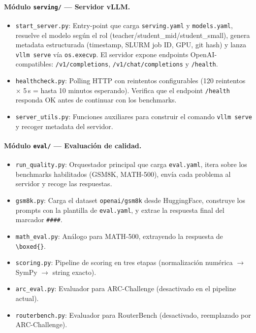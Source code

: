\documentclass[11pt,a4paper]{article}
\begin{document}
\paragraph{M\'odulo \texttt{serving/} --- Servidor vLLM.}
\begin{itemize}[leftmargin=2em]
  \item \texttt{start\_server.py}: Entry-point que carga
    \texttt{serving.yaml} y \texttt{models.yaml}, resuelve el modelo
    seg\'un el rol (teacher/student\_mid/student\_small), genera metadata
    estructurada (timestamp, SLURM job ID, GPU, git hash) y lanza
    \texttt{vllm serve} v\'ia \texttt{os.execvp}. El servidor expone
    endpoints OpenAI-compatibles: \texttt{/v1/completions},
    \texttt{/v1/chat/completions} y \texttt{/health}.
  \item \texttt{healthcheck.py}: Polling HTTP con reintentos
    configurables (120 reintentos $\times$ 5\,s = hasta 10 minutos
    esperando). Verifica que el endpoint \texttt{/health} responda OK
    antes de continuar con los benchmarks.
  \item \texttt{server\_utils.py}: Funciones auxiliares para construir
    el comando \texttt{vllm serve} y recoger metadata del servidor.
\end{itemize}

\paragraph{M\'odulo \texttt{eval/} --- Evaluaci\'on de calidad.}
\begin{itemize}[leftmargin=2em]
  \item \texttt{run\_quality.py}: Orquestador principal que carga
    \texttt{eval.yaml}, itera sobre los benchmarks habilitados (GSM8K,
    MATH-500), env\'ia cada problema al servidor y recoge las respuestas.
  \item \texttt{gsm8k.py}: Carga el dataset \texttt{openai/gsm8k} desde
    HuggingFace, construye los prompts con la plantilla de
    \texttt{eval.yaml}, y extrae la respuesta final del marcador
    \texttt{\#\#\#\#}.
  \item \texttt{math\_eval.py}: An\'alogo para MATH-500, extrayendo
    la respuesta de \texttt{\textbackslash boxed\{\}}.
  \item \texttt{scoring.py}: Pipeline de scoring en tres etapas
    (normalizaci\'on num\'erica $\to$ SymPy $\to$ string exacto).
  \item \texttt{arc\_eval.py}: Evaluador para ARC-Challenge
    (desactivado en el pipeline actual).
  \item \texttt{routerbench.py}: Evaluador para RouterBench
    (desactivado, reemplazado por ARC-Challenge).
\end{itemize}
\end{document}
